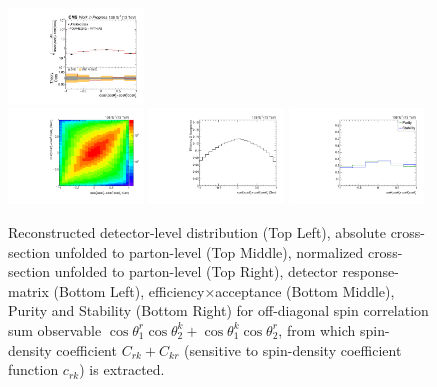 \begin{refsection}
\begin{figure}[htb]
\begin{center}
 \includegraphics[width=0.32\textwidth]{fig_fullRun2UL/unfolding/combined/UnfoldedResultsNorm_c_Prk.pdf} \\
 \includegraphics[width=0.32\textwidth]{fig_fullRun2UL/unfolding/combined/ResponseMatrix_c_Prk.pdf}
 \includegraphics[width=0.32\textwidth]{fig_fullRun2UL/unfolding/combined/TotEff_c_Prk.pdf}
 \includegraphics[width=0.32\textwidth]{fig_fullRun2UL/unfolding/combined/PurStab_c_Prk.pdf} \\
\caption{Reconstructed detector-level distribution (Top Left), absolute cross-section unfolded to parton-level (Top Middle), normalized cross-section unfolded to parton-level (Top Right), detector response-matrix (Bottom Left), efficiency$\times$acceptance (Bottom Middle), Purity and Stability (Bottom Right) for off-diagonal spin correlation sum observable $\cos\theta_{1}^{r}\cos\theta_{2}^{k}+\cos\theta_{1}^{k}\cos\theta_{2}^{r}$, from which spin-density coefficient $C_{rk}+C_{kr}$ (sensitive to spin-density coefficient function $c_{r k}$) is extracted.}
\label{fig:c_Prk}
\end{center}
\end{figure}
\clearpage
\begin{figure}[htb]
\begin{center}

\end{center}
\end{figure}
\end{refsection}
